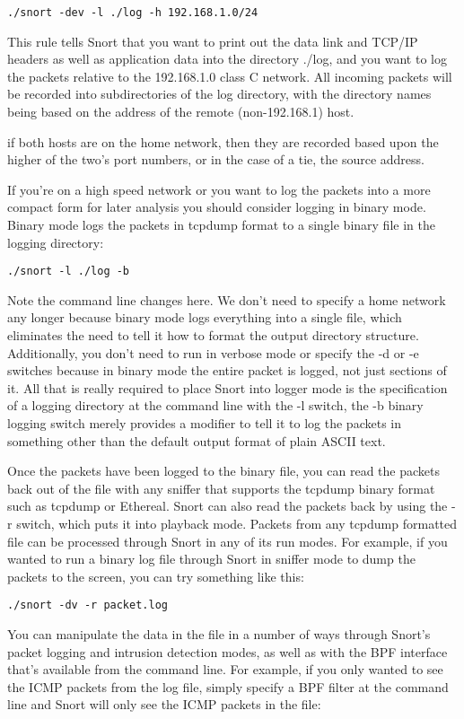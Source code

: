 \documentclass[english]{report}
\newenvironment{note}{
    \vspace{10pt}{\textsf{
        {\Huge{$\triangle$\hspace{-12.5pt}{\Large{$^!$}}}}\hspace{5pt}
        {\Large{NOTE}}
    }
    }

    \begin{center}
    \par\vspace{-10pt}
    \begin{lrbox}{\savepar}
    \begin{minipage}[r]{6.2in}
}
{
    \end{minipage}
    \end{lrbox}
    \fbox{
        \usebox{
            \savepar
        }
    }
    \par\vskip10pt
    \end{center}
}
\begin{document}
\begin{verbatim}
./snort -dev -l ./log -h 192.168.1.0/24
\end{verbatim}
This rule tells Snort that you want to print out the data link and
TCP/IP headers as well as application data into the directory ./log,
and you want to log the packets relative to the 192.168.1.0 class
C network. All incoming packets will be recorded into subdirectories
of the log directory, with the directory names being based on the
address of the remote (non-192.168.1) host. 

\begin{note}
if both hosts are on the home network, then they are recorded based upon the
higher of the two's port numbers, or in the case of a tie, the source
address.
\end{note}

If you're on a high speed network or you want to log the packets into
a more compact form for later analysis you should consider logging
in binary mode. Binary mode logs the packets in
tcpdump format to a single binary file in the
logging directory:

\begin{verbatim}
./snort -l ./log -b
\end{verbatim}
Note the command line changes here. We don't need to specify a home
network any longer because binary mode logs everything into a single
file, which eliminates the need to tell it how to format the output
directory structure. Additionally, you don't need to run in verbose
mode or specify the -d or -e switches because in binary mode the entire
packet is logged, not just sections of it. All that is really required
to place Snort into logger mode is the specification of a logging
directory at the command line with the -l switch, the -b binary logging
switch merely provides a modifier to tell it to log the packets in
something other than the default output format of plain ASCII text.

Once the packets have been logged to the binary file, you can read
the packets back out of the file with any sniffer that supports the
tcpdump binary format such as tcpdump or Ethereal. Snort can also
read the packets back by using the -r switch, which puts it into playback
mode. Packets from any tcpdump formatted file can be processed through
Snort in any of its run modes. For example, if you wanted to run a
binary log file through Snort in sniffer mode to dump the packets
to the screen, you can try something like this:

\begin{verbatim}
./snort -dv -r packet.log
\end{verbatim}
You can manipulate the data in the file in a number of ways through
Snort's packet logging and intrusion detection modes, as well as with
the BPF interface that's available from the command line. For example,
if you only wanted to see the ICMP packets from the log file, simply
specify a BPF filter at the command line and Snort will only see
the ICMP packets in the file:
\end{document}

